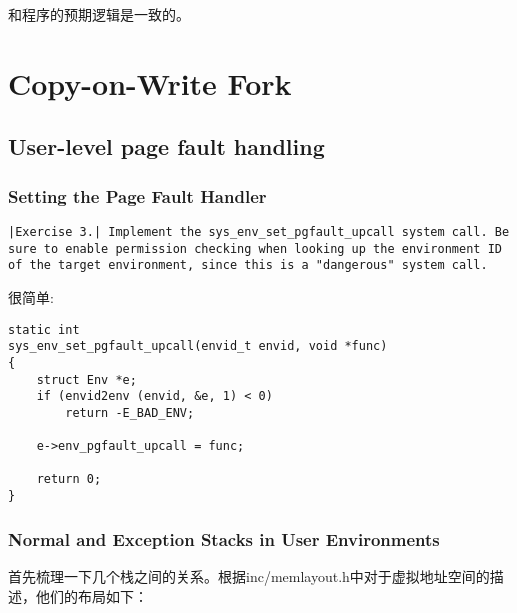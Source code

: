 \documentclass{article}
\begin{document}
\begin{CJK*}{UTF8}{gkai}
和程序的预期逻辑是一致的。


\section{Copy-on-Write Fork}

\subsection{User-level page fault handling}

\subsubsection{Setting the Page Fault Handler}

\newpage

\begin{lstlisting}[style=exercise]
|Exercise 3.| Implement the sys_env_set_pgfault_upcall system call. Be sure to enable permission checking when looking up the environment ID of the target environment, since this is a "dangerous" system call.
\end{lstlisting}

很简单:

\begin{lstlisting}[style=ccode, title={\scriptsize \ttfamily \bfseries kern/syscall.c: sys\_env\_set\_pgfault\_upcall()}]
static int
sys_env_set_pgfault_upcall(envid_t envid, void *func)
{
    struct Env *e;
    if (envid2env (envid, &e, 1) < 0)
        return -E_BAD_ENV;

    e->env_pgfault_upcall = func;

    return 0;
}
\end{lstlisting}


\subsubsection{Normal and Exception Stacks in User Environments}

首先梳理一下几个栈之间的关系。根据inc/memlayout.h中对于虚拟地址空间的描述，他们的布局如下：


\end{CJK*}
\end{document}
